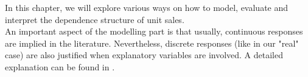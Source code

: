 
In this chapter, we will explore various ways on how to model, evaluate and interpret the dependence structure of unit sales. 
\\





An important aspect of the modelling part is that usually, continuous responses are implied in the literature. Nevertheless, discrete responses (like in our "real" case) are also justified when explanatory variables are involved. A detailed explanation can be found in \cite{trivedi2017note}.


